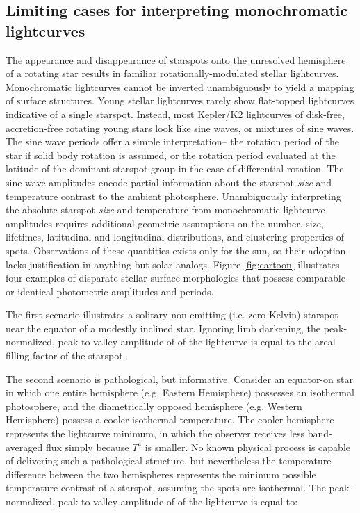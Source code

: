 \documentclass[twocolumn]{emulateapj}%
\begin{document}
\subsection{Limiting cases for interpreting monochromatic lightcurves}
The appearance and disappearance of starspots onto the unresolved hemisphere of a rotating star results in familiar rotationally-modulated stellar lightcurves.  Monochromatic lightcurves cannot be inverted unambiguously to yield a mapping of surface structures.  Young stellar lightcurves rarely show flat-topped lightcurves indicative of a single starspot.  Instead, most Kepler/K2 lightcurves of disk-free, accretion-free rotating young stars look like sine waves, or mixtures of sine waves.  The sine wave periods offer a simple interpretation-- the rotation period of the star if solid body rotation is assumed, or the rotation period evaluated at the latitude of the dominant starspot group in the case of differential rotation.  The sine wave amplitudes encode partial information about the starspot \emph{size} and temperature contrast to the ambient photosphere.  Unambiguously interpreting the absolute starspot \emph{size} and temperature from monochromatic lightcurve amplitudes requires additional geometric assumptions on the number, size, lifetimes, latitudinal and longitudinal distributions, and clustering properties of spots.  Observations of these quantities exists only for the sun, so their adoption lacks justification in anything but solar analogs.  Figure \ref{fig:cartoon} illustrates four examples of disparate stellar surface morphologies that possess comparable or identical photometric amplitudes and periods.

The first scenario illustrates a solitary non-emitting (i.e. zero Kelvin) starspot near the equator of a modestly inclined star.  Ignoring limb darkening, the peak-normalized, peak-to-valley amplitude of of the lightcurve is equal to the areal filling factor of the starspot.

The second scenario is pathological, but informative.  Consider an equator-on star in which one entire hemisphere (e.g. Eastern Hemisphere) possesses an isothermal photosphere, and the diametrically opposed hemisphere (e.g. Western Hemisphere) possess a cooler isothermal temperature.  The cooler hemisphere represents the lightcurve minimum, in which the observer receives less band-averaged flux simply because $T^4$ is smaller.  No known physical process is capable of delivering such a pathological structure, but nevertheless the temperature difference between the two hemispheres represents the minimum possible temperature contrast of a starspot, assuming the spots are isothermal.  The peak-normalized, peak-to-valley amplitude of of the lightcurve is equal to:
\end{document}
